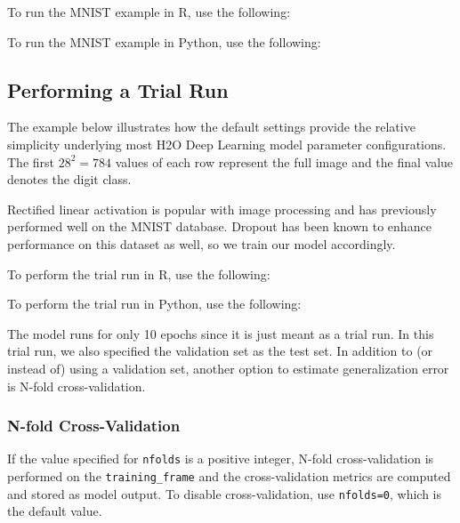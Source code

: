 {{\newpage
\waterExampleInR
To run the MNIST example in R, use the following: 


\waterExampleInPython
To run the MNIST example in Python, use the following: 


\newpage
\subsection{Performing a Trial Run}
\label{ssec:TrialRun} 

The example below illustrates how the default settings provide the relative simplicity underlying most H2O Deep Learning model parameter configurations. The first $28^2 = 784$ values of each row represent the full image and the final value denotes the digit class. 

Rectified linear activation is popular with image processing and has previously performed well on the MNIST database. Dropout has been known to enhance performance on this dataset as well, so we train our model accordingly. 


To perform the trial run in R, use the following: 

\waterExampleInR


\newpage

To perform the trial run in Python, use the following: 

\waterExampleInPython


\noindent
The model runs for only 10 epochs since it is just meant as a trial run. In this trial run, we also specified the validation set as the test set.  In addition to (or instead of) using a validation set, another option to estimate generalization error is N-fold cross-validation.

\newpage
\subsubsection{N-fold Cross-Validation} 

If the value specified for \texttt{nfolds} is a positive integer, N-fold cross-validation is performed on the \texttt{training\_frame} and the cross-validation metrics are computed and stored as model output.  To disable cross-validation, use \texttt{nfolds=0}, which is the default value.  

}}
